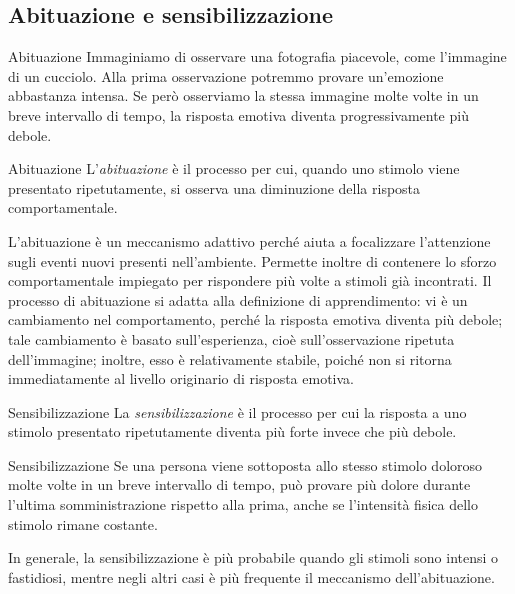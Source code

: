 \documentclass[a4paper]{article}
\begin{document}
\subsection{Abituazione e sensibilizzazione}
\begin{snippetexample}{Abituazione}
    Immaginiamo di osservare una fotografia piacevole, come l'immagine di un cucciolo. Alla prima osservazione potremmo provare un'emozione abbastanza intensa. Se però osserviamo la stessa immagine molte volte in un breve intervallo di tempo, la risposta emotiva diventa progressivamente più debole.
\end{snippetexample}
\begin{snippetdefinition}{Abituazione}
    L'\emph{abituazione} è il processo per cui, quando uno stimolo viene presentato ripetutamente, si osserva una diminuzione della risposta comportamentale.
\end{snippetdefinition}
L'abituazione è un meccanismo adattivo perché aiuta a focalizzare l'attenzione sugli eventi nuovi presenti nell'ambiente. Permette inoltre di contenere lo sforzo comportamentale impiegato per rispondere più volte a stimoli già incontrati.
Il processo di abituazione si adatta alla definizione di apprendimento: vi è un cambiamento nel comportamento, perché la risposta emotiva diventa più debole; tale cambiamento è basato sull'esperienza, cioè sull'osservazione ripetuta dell'immagine; inoltre, esso è relativamente stabile, poiché non si ritorna immediatamente al livello originario di risposta emotiva.
\begin{snippetdefinition}{Sensibilizzazione}
    La \emph{sensibilizzazione} è il processo per cui la risposta a uno stimolo presentato ripetutamente diventa più forte invece che più debole.
\end{snippetdefinition}
\begin{snippetexample}{Sensibilizzazione}
    Se una persona viene sottoposta allo stesso stimolo doloroso molte volte in un breve intervallo di tempo, può provare più dolore durante l'ultima somministrazione rispetto alla prima, anche se l'intensità fisica dello stimolo rimane costante.
\end{snippetexample}
In generale, la sensibilizzazione è più probabile quando gli stimoli sono intensi o fastidiosi, mentre negli altri casi è più frequente il meccanismo dell'abituazione.
\end{document}
